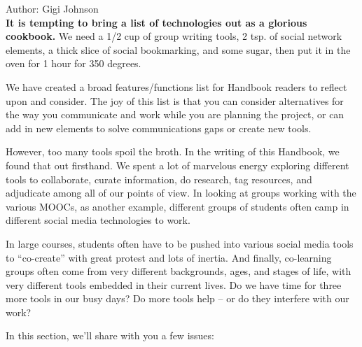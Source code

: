 Author: Gigi Johnson \\

\textbf{It is tempting to bring a list of technologies out as a glorious
cookbook.} We need a 1/2 cup of group writing tools, 2 tsp. of social
network elements, a thick slice of social bookmarking, and some sugar,
then put it in the oven for 1 hour for 350 degrees.

We have created a broad features/functions list for Handbook readers to
reflect upon and consider. The joy of this list is that you can consider
alternatives for the way you communicate and work while you are planning
the project, or can add in new elements to solve communications gaps or
create new tools.

However, too many tools spoil the broth. In the writing of this
Handbook, we found that out firsthand. We spent a lot of marvelous
energy exploring different tools to collaborate, curate information, do
research, tag resources, and adjudicate among all of our points of view.
In looking at groups working with the various MOOCs, as another example,
different groups of students often camp in different social media
technologies to work.

In large courses, students often have to be pushed into various social
media tools to ``co-create'' with great protest and lots of inertia. And
finally, co-learning groups often come from very different backgrounds,
ages, and stages of life, with very different tools embedded in their
current lives. Do we have time for three more tools in our busy days? Do
more tools help -- or do they interfere with our work?

In this section, we'll share with you a few issues:

